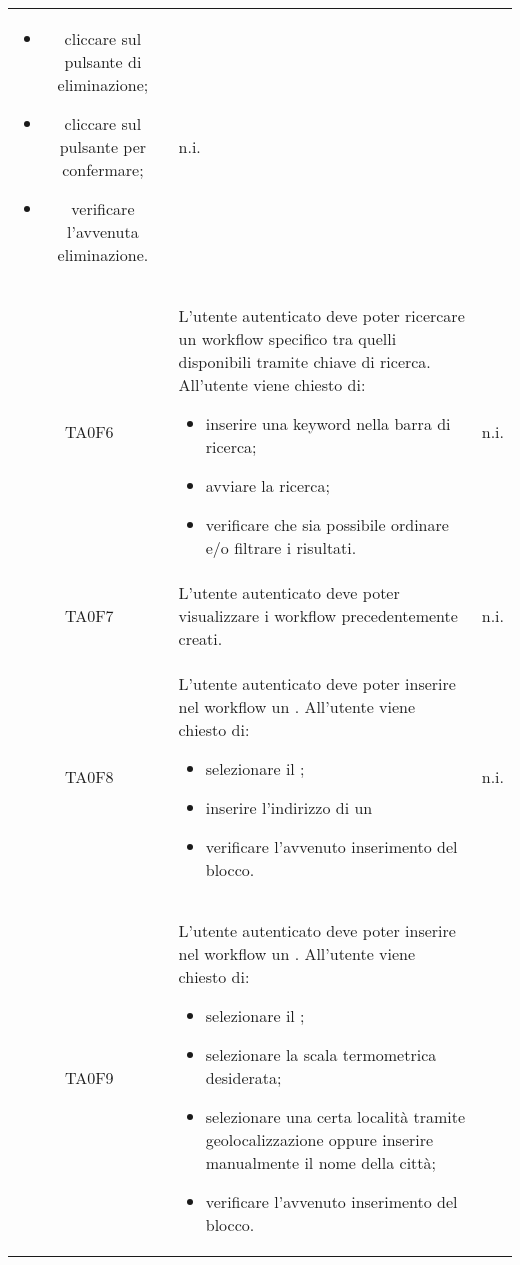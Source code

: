 \begin{center}
\begin{longtable}{ c m{12cm} c }
\begin{itemize}
		\item cliccare sul pulsante di eliminazione;			
		\item cliccare sul pulsante per confermare;			
		\item verificare l'avvenuta eliminazione.			
	\end{itemize}     																												   											& n.i. \\
	TA0F6  & L'utente autenticato deve poter ricercare un workflow specifico tra quelli disponibili tramite chiave di ricerca. All'utente viene chiesto di: 
	\begin{itemize}
		\item inserire una keyword nella barra di ricerca;
		\item avviare la ricerca;
		\item verificare che sia possibile ordinare e/o filtrare i risultati.
	\end{itemize}        																											   											& n.i. \\
	TA0F7  & L'utente autenticato deve poter visualizzare i workflow precedentemente creati.                                        											& n.i. \\
	TA0F8  & L'utente autenticato deve poter inserire nel workflow un \BFeedRSS. All'utente viene chiesto di:
	 \begin{itemize}											
		\item selezionare il \BFeedRSS;											
		\item inserire l'indirizzo di un \BFeedRSS											
		\item verificare l'avvenuto inserimento del blocco.											
	\end{itemize}    																												   											& n.i. \\
	TA0F9  & L'utente autenticato deve poter inserire nel workflow un \BMeteo. All'utente viene chiesto di: 
	\begin{itemize}											
		\item selezionare il \BMeteo;											
		\item selezionare la scala termometrica desiderata;											
		\item selezionare una certa località tramite geolocalizzazione oppure inserire manualmente il nome della città;											
		\item verificare l'avvenuto inserimento del blocco.											

\end{itemize}
\end{longtable}
\end{center}
